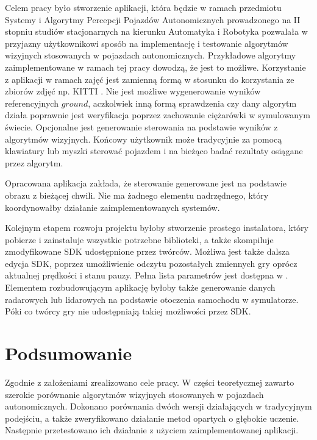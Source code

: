Celem pracy było stworzenie aplikacji, która będzie w ramach przedmiotu Systemy i Algorytmy Percepcji Pojazdów Autonomicznych prowadzonego na II stopniu studiów stacjonarnych na kierunku Automatyka i Robotyka pozwalała w przyjazny użytkownikowi sposób na implementację i testowanie algorytmów wizyjnych stosowanych w pojazdach autonomicznych. 
Przykładowe algorytmy zaimplementowane w ramach tej pracy dowodzą, że jest to możliwe. 
Korzystanie z aplikacji w ramach zajęć jest zamienną formą w stosunku do korzystania ze zbiorów zdjęć np. KITTI \cite{W6}. %
Nie jest możliwe wygenerowanie wyników referencyjnych $ground$, aczkolwiek inną formą sprawdzenia czy dany algorytm działa poprawnie jest weryfikacja poprzez zachowanie ciężarówki w symulowanym świecie. %
Opcjonalne jest generowanie sterowania na podstawie wyników z algorytmów wizyjnych. 
Końcowy użytkownik może tradycyjnie za pomocą klawiatury lub myszki sterować pojazdem i na bieżąco badać rezultaty osiągane przez algorytm.

Opracowana aplikacja zakłada, że sterowanie generowane jest na podstawie obrazu z bieżącej chwili. Nie ma żadnego elementu nadrzędnego, który koordynowałby działanie zaimplementowanych systemów.

Kolejnym etapem rozwoju projektu byłoby stworzenie prostego instalatora, który pobierze i zainstaluje wszystkie potrzebne biblioteki, a także skompiluje zmodyfikowane SDK udostępnione przez twórców. 
Możliwa jest także dalsza edycja SDK, poprzez umożliwienie odczytu pozostałych zmiennych gry oprócz aktualnej prędkości i stanu pauzy. 
Pełna lista parametrów jest dostępna w \cite{S3}. 
Elementem rozbudowującym aplikację byłoby także generowanie danych radarowych lub lidarowych na podstawie otoczenia samochodu w symulatorze. 
Póki co twórcy gry nie udostępniają takiej możliwości przez SDK.




\chapter{Podsumowanie}
Zgodnie z założeniami zrealizowano cele pracy. 
W części teoretycznej zawarto szerokie porównanie algorytmów wizyjnych stosowanych w pojazdach autonomicznych. 
Dokonano porównania dwóch wersji działających w tradycyjnym podejściu, a także zweryfikowano działanie metod opartych o głębokie uczenie. Następnie przetestowano ich działanie z użyciem zaimplementowanej aplikacji. %

